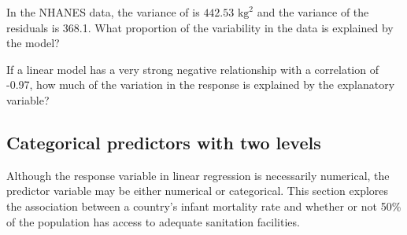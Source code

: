 \begin{exercisewrap}
\begin{nexercise}
In the NHANES data, the variance of  is $442.53$ $\text{kg}^2$ and the variance of the residuals is 368.1. What proportion of the variability in the data is explained by the model?\footnotemark{}
\end{nexercise}
\end{exercisewrap}

\begin{exercisewrap}
\begin{nexercise}
If a linear model has a very strong negative relationship with a correlation of -0.97, how much of the variation in the response is explained by the explanatory variable?\footnotemark{}
\end{nexercise}
\end{exercisewrap}



\textD{\newpage}


\subsection{Categorical predictors with two levels}
\label{categoricalPredictorsWithTwoLevels}


Although the response variable in linear regression is necessarily numerical, the predictor variable may be either numerical or categorical. This section explores the association between a country's infant mortality rate and whether or not 50\% of the population has access to adequate sanitation facilities. 

